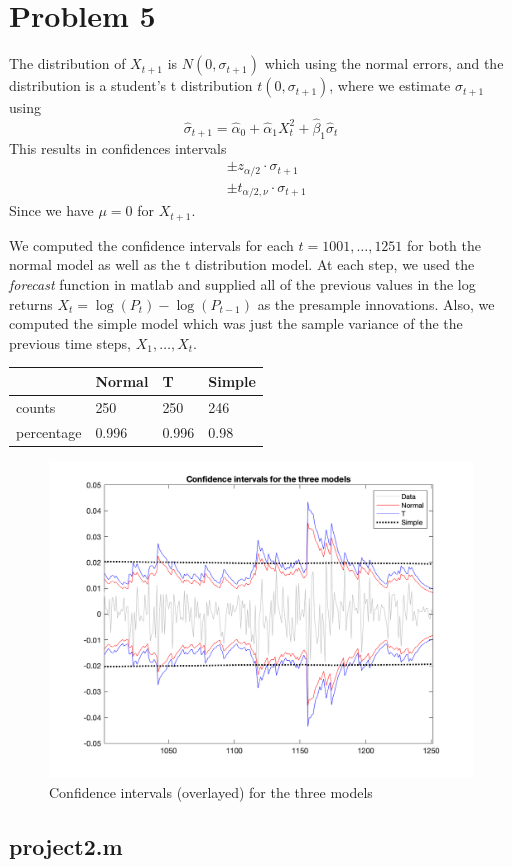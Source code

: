 \documentclass{article}
\begin{document}
\section*{Problem 5}
The distribution of $X_{t + 1}$ is $N(0, \sigma_{t+1})$ which using the normal errors,
and the distribution is a student's t distribution $t(0, \sigma_{t + 1})$,
where we estimate $\sigma_{t + 1}$ using
$$
\hat{\sigma}_{t + 1} = \hat{\alpha}_0 + \hat{\alpha}_1 X_t^2 + \hat{\beta}_1 \hat{\sigma}_t
$$
This results in confidences intervals
\begin{align*}
&\pm z_{\alpha/2} \cdot \sigma_{t + 1}\\
&\pm t_{\alpha/2, \nu} \cdot \sigma_{t + 1}
\end{align*}
Since we have $\mu = 0$ for $X_{t + 1}$.

We computed the confidence intervals for each $t = 1001,\ldots, 1251$ for both the normal model as well as the t distribution model.
At each step, we used the \textit{forecast} function in matlab and supplied all of the previous values in the log returns $X_t = \log(P_t) - \log(P_{t - 1})$ as the presample innovations.
Also, we computed the simple model which was just the sample variance of the the previous time steps, $X_1, \ldots, X_t$.

\begin{table}[H]
  \centering
\begin{tabular}{l | lll}
& Normal & T & Simple\\ \hline
counts & 250  & 250 & 246 \\
percentage & 0.996 & 0.996 & 0.98   \\
\end{tabular}
\end{table}

\begin{figure}[H]
\includegraphics[width=16cm]{plots/conf_ints_overlay.png}
\centering
\caption{Confidence intervals (overlayed) for the three models}
\label{fig:conf_intervals}
\end{figure}

\begin{appendices}

\subsection{project2.m}


\end{appendices}

%
%
\end{document}
